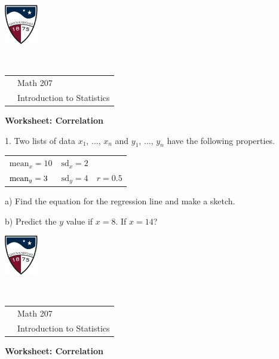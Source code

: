 \documentclass[10pt]{article}
\begin{document}
\pagestyle{empty}

\href{http://www.su.edu}{\includegraphics[height=1.75cm]{sulogo.eps}}
\vspace{-1.69cm}

{\small{\ }\hfill
\begin{tabular}{cl}
& Math 207\\& Introduction to Statistics\\
\end{tabular}
}
\setlength{\baselineskip}{1.05\baselineskip}
\medskip

{\setlength{\baselineskip}{1.05\baselineskip}
\begin{center}
\textbf{\large  Worksheet:  Correlation}
\end{center}

\newcommand{\Z}{\hphantom{0}}
1. Two lists of data $x_1$, $\dots$, $x_n$ and $y_1$, $\dots$, $y_n$ have
the following properties.  
\begin{center}
\begin{tabular}{ccc}
$\mbox{mean}_x = 10$ & $\mbox{sd}_x=2$ & \\
$\mbox{mean}_y = 3\Z$  & $\mbox{sd}_y=4$ & $r=0.5$
\end{tabular}
\end{center}

\hspace{20pt} a) Find the equation for the regression line and make a sketch.
\vspace{1.75in}

\hspace{20pt} b) Predict the $y$ value if $x=8$.  If $x=14$?
\vfill


\href{http://www.su.edu}{\includegraphics[height=1.75cm]{sulogo.eps}}
\vspace{-1.69cm}

{\small{\ }\hfill
\begin{tabular}{cl}
& Math 207\\ & Introduction to  Statistics\\
\end{tabular}
}
\begin{center}
\textbf{\large  Worksheet:  Correlation}
\end{center}

}
\end{document}
